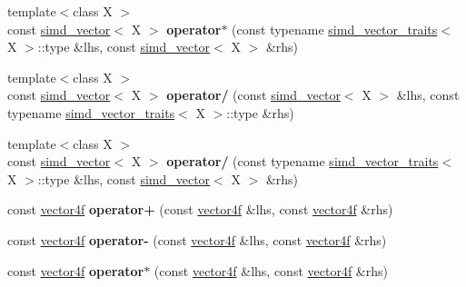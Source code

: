 \begin{DoxyCompactItemize}
\item 
\hypertarget{namespacesimd_aa573b469c1794fa5e5ecd365b41789d5}{{\footnotesize template$<$class X $>$ }\\const \hyperlink{classsimd_1_1simd__vector}{simd\+\_\+vector}$<$ X $>$ {\bfseries operator$\ast$} (const typename \hyperlink{structsimd_1_1simd__vector__traits}{simd\+\_\+vector\+\_\+traits}$<$ X $>$\+::type \&lhs, const \hyperlink{classsimd_1_1simd__vector}{simd\+\_\+vector}$<$ X $>$ \&rhs)}\label{namespacesimd_aa573b469c1794fa5e5ecd365b41789d5}

\item 
\hypertarget{namespacesimd_acc9d32211eaf839be5edb0e4baf09166}{{\footnotesize template$<$class X $>$ }\\const \hyperlink{classsimd_1_1simd__vector}{simd\+\_\+vector}$<$ X $>$ {\bfseries operator/} (const \hyperlink{classsimd_1_1simd__vector}{simd\+\_\+vector}$<$ X $>$ \&lhs, const typename \hyperlink{structsimd_1_1simd__vector__traits}{simd\+\_\+vector\+\_\+traits}$<$ X $>$\+::type \&rhs)}\label{namespacesimd_acc9d32211eaf839be5edb0e4baf09166}

\item 
\hypertarget{namespacesimd_adeb8e8596639e2a6bcad5fb2ab5953f9}{{\footnotesize template$<$class X $>$ }\\const \hyperlink{classsimd_1_1simd__vector}{simd\+\_\+vector}$<$ X $>$ {\bfseries operator/} (const typename \hyperlink{structsimd_1_1simd__vector__traits}{simd\+\_\+vector\+\_\+traits}$<$ X $>$\+::type \&lhs, const \hyperlink{classsimd_1_1simd__vector}{simd\+\_\+vector}$<$ X $>$ \&rhs)}\label{namespacesimd_adeb8e8596639e2a6bcad5fb2ab5953f9}

\item 
\hypertarget{namespacesimd_a1e22e6fe128fbe472d56957dbb882b85}{const \hyperlink{classsimd_1_1vector4f}{vector4f} {\bfseries operator+} (const \hyperlink{classsimd_1_1vector4f}{vector4f} \&lhs, const \hyperlink{classsimd_1_1vector4f}{vector4f} \&rhs)}\label{namespacesimd_a1e22e6fe128fbe472d56957dbb882b85}

\item 
\hypertarget{namespacesimd_a14c4e3db5500a723668945acc5ee4959}{const \hyperlink{classsimd_1_1vector4f}{vector4f} {\bfseries operator-\/} (const \hyperlink{classsimd_1_1vector4f}{vector4f} \&lhs, const \hyperlink{classsimd_1_1vector4f}{vector4f} \&rhs)}\label{namespacesimd_a14c4e3db5500a723668945acc5ee4959}

\item 
\hypertarget{namespacesimd_a513f1a959fed1bce08e1bfa752cf5c0d}{const \hyperlink{classsimd_1_1vector4f}{vector4f} {\bfseries operator$\ast$} (const \hyperlink{classsimd_1_1vector4f}{vector4f} \&lhs, const \hyperlink{classsimd_1_1vector4f}{vector4f} \&rhs)}\label{namespacesimd_a513f1a959fed1bce08e1bfa752cf5c0d}


\end{DoxyCompactItemize}
